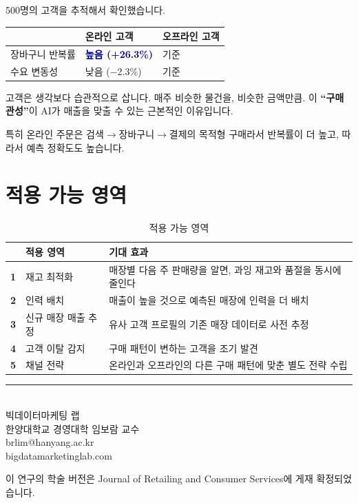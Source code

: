 \documentclass[11pt, a4paper]{article}
\begin{document}
500명의 고객을 추적해서 확인했습니다.

\begin{table}[H]
\centering
\large
\begin{tabular}{L{6cm} C{4cm} C{4cm}}
\toprule
{} & \textbf{온라인 고객} & \textbf{오프라인 고객} \\
\midrule
장바구니 반복률 & \textcolor{darkblue}{\textbf{높음 (+26.3\%)}} & 기준 \\[4pt]
수요 변동성 & 낮음 ($-$2.3\%) & 기준 \\
\bottomrule
\end{tabular}
\end{table}

고객은 생각보다 습관적으로 삽니다. 매주 비슷한 물건을, 비슷한 금액만큼. 이 \textbf{``구매 관성''}이 AI가 매출을 맞출 수 있는 근본적인 이유입니다.

특히 온라인 주문은 검색$\rightarrow$장바구니$\rightarrow$결제의 목적형 구매라서 반복률이 더 높고, 따라서 예측 정확도도 높습니다.

\section{적용 가능 영역}

\begin{table}[H]
\centering
\begin{tabularx}{\textwidth}{C{0.8cm} L{4cm} X}
\toprule
{} & \textbf{적용 영역} & \textbf{기대 효과} \\
\midrule
\textbf{1} & 재고 최적화 & 매장별 다음 주 판매량을 알면, 과잉 재고와 품절을 동시에 줄인다 \\[6pt]
\textbf{2} & 인력 배치 & 매출이 높을 것으로 예측된 매장에 인력을 더 배치 \\[6pt]
\textbf{3} & 신규 매장 매출 추정 & 유사 고객 프로필의 기존 매장 데이터로 사전 추정 \\[6pt]
\textbf{4} & 고객 이탈 감지 & 구매 패턴이 변하는 고객을 조기 발견 \\[6pt]
\textbf{5} & 채널 전략 & 온라인과 오프라인의 다른 구매 패턴에 맞춘 별도 전략 수립 \\
\bottomrule
\end{tabularx}
\caption{적용 가능 영역}
\end{table}

\vspace{1cm}

\begin{center}
\textcolor{medblue}{\rule{6cm}{0.5pt}}\\[12pt]
{\large\color{darkgray}
빅데이터마케팅 랩\\[4pt]
한양대학교 경영대학 임보람 교수\\[4pt]
brlim@hanyang.ac.kr\\[4pt]
bigdatamarketinglab.com}
\end{center}

\vspace{0.5cm}
{\footnotesize\color{darkgray} 이 연구의 학술 버전은 Journal of Retailing and Consumer Services에 게재 확정되었습니다.}
\end{document}
